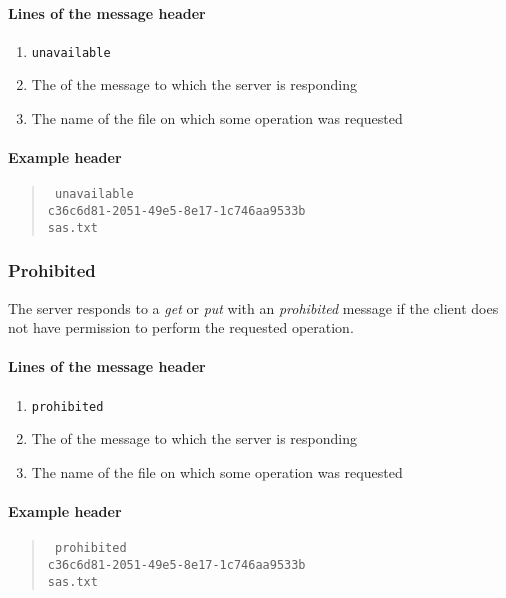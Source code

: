 \documentclass[10pt]{article}
\begin{document}
\paragraph{Lines of the message header}
\begin{enumerate}
\item \texttt{unavailable}
\item The  of the message to which the server is responding
\item The name of the file on which some operation was requested
\end{enumerate}

\paragraph{Example header}
\begin{quote}
\texttt{%
unavailable \\
c36c6d81-2051-49e5-8e17-1c746aa9533b \\
sas.txt
}
\end{quote}

\subsubsection{Prohibited}

The server responds to a \textit{get} or \textit{put} with an \textit{prohibited} message
if the client does not have permission to perform the requested operation.

\paragraph{Lines of the message header}
\begin{enumerate}
\item \texttt{prohibited}
\item The  of the message to which the server is responding
\item The name of the file on which some operation was requested
\end{enumerate}

\paragraph{Example header}
\begin{quote}
\texttt{%
prohibited \\
c36c6d81-2051-49e5-8e17-1c746aa9533b \\
sas.txt
}
\end{quote}
\end{document}

